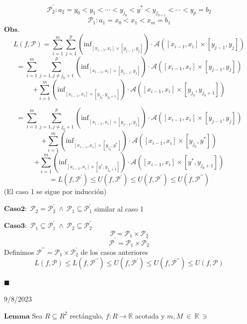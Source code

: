 \documentclass[10pt,a4paper]{article}
\begin{document}
$$ \mathcal{P}_2^{\prime } : a_2 = y_0 <y_1< \cdots < y_{j_0}<y^{*} < y_{j_{0+1}} < \cdots < y_p = b_2 $$
$$ \mathcal{P}_1 : a_1 = x_0 <x_1 < x_m = b_1 $$
\color{red} 
$\mathbf{Obs.}$
\color{black} 
$$ L \left( f, \mathcal{P}  \right) = \sum_{i=1}^{m} \sum_{j=1}^{p} 
\left( \text{inf} _{ \left[ x_{i-1} , x_i \right] \times \left[ y_{j-1}, y_j \right]   } \right) \cdot  \mathcal{A} 
 \left( \left[ x_{i-1}, x_i \right] \times \left[ y_{j-1} , y_j \right]   \right)   $$
$$
= \sum_{i=1}^{m}  \sum_{{j=1,j\neq j_0 +1} } ^{p} \left( \text{inf} _ { \left[ x_{i-1}, x_i \right] \times \left[ y_{j-1}, y_j \right]  } \right)  
\cdot \mathcal{A} \left( \left[ x_{i-1} , x_i \right] \times \left[ y_{j-1},y_j \right]   \right)  
$$
$$
+  \sum_{i=1}^{m} \left( \text{inf}_{ \left[ x_{i-1},x_i \right] \times \left[ y_{j_0} , y_{j_0 +1} \right]   } \right)  \cdot 
\mathcal{A} \left( \left[ x_{i-1} , x_i \right] \times \left[ y_{j_0} , y_{j_0 +1} \right]   \right)   
$$

$$
= \sum_{i=1}^{m}  \sum_{{j=1,j\neq j_0 +1} } ^{p} \left( \text{inf} _ { \left[ x_{i-1}, x_i \right] \times \left[ y_{j-1}, y_j \right]  } \right)  
\cdot \mathcal{A} \left( \left[ x_{i-1} , x_i \right] \times \left[ y_{j-1},y_j \right]   \right)  
$$
$$
+  \sum_{i=1}^{m} \left( \text{inf}_{ \left[ x_{i-1},x_i \right] \times \left[ y_{j_0} , y^{*} \right]   } \right)  \cdot 
\mathcal{A} \left( \left[ x_{i-1} , x_i \right] \times \left[ y_{j_0} , y^{*} \right]   \right)   
$$ 
$$ + \sum_{i=1}^{m} \left( \text{inf}_{ \left[ x_{i-1},x_i \right] \times \left[ y^{*} , y_{j_0+1} \right]   } \right)  \cdot 
\mathcal{A} \left( \left[ x_{i-1} , x_i \right] \times \left[ y^{*} , y_{j_0 +1} \right]   \right)   
$$
$$ = L \left( f , \mathcal{P}^{\prime}  \right) \leq U \left( f, \mathcal{P} ^{\prime}  \right) \leq U \left( f, \mathcal{P} ^{\prime}  \right) \leq U \left( f , \mathcal{P} ^{ \prime \prime }  \right)     $$
(El caso 1 se sigue por inducción) 

\color{red} 
$\mathbf{Caso 2:}$
\color{black} 
$ \mathcal{P}_2  = \mathcal{P}_2 ^{\prime} \ \wedge \ \mathcal{P}_1 \subseteq \mathcal{P} _1 ^{\prime}  $ similar al caso 1

\newpage
\color{red} 
$\mathbf{Caso3:}$
\color{black} 
$ \mathcal{P}_1 \subseteq \mathcal{P}_1 ^{\prime} \ \wedge \ \mathcal{P}_2 \subseteq \mathcal{P}_2 ^{\prime} $ \\
$$ \mathcal{P} = \mathcal{P}_1 \times \mathcal{P}_2    $$
$$ \mathcal{P} ^{\prime} = \mathcal{P}_1 \times \mathcal{P}_2^{\prime}    $$
Definimos $\mathcal{P} ^{\prime \prime} = \mathcal{P}_1 \times \mathcal{P}_2 ^{\prime}   $ de los casos anteriores
$$ L \left( f , \mathcal{P} \right) \leq L \left( f, \mathcal{P} ^{\prime \prime}  \right) \leq 
U \left( f, \mathcal{P }^{\prime}  \right) \leq U \left( f, \mathcal{P}^{\prime \prime}  \right) \leq 
U \left( f, \mathcal{P}  \right)  $$
\begin{flushright}
$\blacksquare$
\end{flushright}

\color{blue}
\begin{flushright}
9/8/2023
\end{flushright}
\color{black}
\color{red} 
$\mathbf{Lemma}$
\color{black} 
Sea $R \subseteq R^2$ rectángulo, $f : R \rightarrow \mathbb{R} $ acotada y $m,M \ \in \ \mathbb{R} \ \ni$ 
\end{document}
